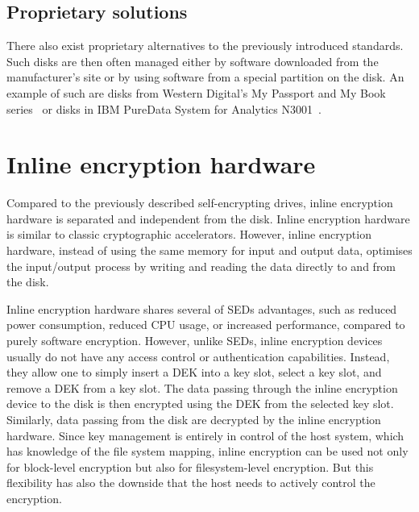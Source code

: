 \subsection{Proprietary solutions}

There also exist proprietary alternatives to the previously introduced standards. Such disks are then often managed either by software downloaded from the manufacturer's site or by using software from a special partition on the disk.
An example of such are disks from Western Digital's My Passport and My Book series~\cite{got_hw_crypto} or disks in IBM PureData System for Analytics N3001~\cite{ibm_sed}.





\section{Inline encryption hardware}

Compared to the previously described self-encrypting drives, inline encryption hardware is separated and independent from the disk. Inline encryption hardware is similar to classic cryptographic accelerators. However, inline encryption hardware, instead of using the same memory for input and output data, optimises the input/output process by writing and reading the data directly to and from the disk.

Inline encryption hardware shares several of SEDs advantages, such as reduced power consumption, reduced CPU usage, or increased performance, compared to purely software encryption.
However, unlike SEDs, inline encryption devices usually do not have any access control or authentication capabilities. Instead, they allow one to simply insert a DEK into a key slot, select a key slot, and remove a DEK from a key slot. The data passing through the inline encryption device to the disk is then encrypted using the DEK from the selected key slot. Similarly, data passing from the disk are decrypted by the inline encryption hardware.
Since key management is entirely in control of the host system, which has knowledge of the file system mapping, inline encryption can be used not only for block-level encryption but also for filesystem-level encryption. But this flexibility has also the downside that the host needs to actively control the encryption.

